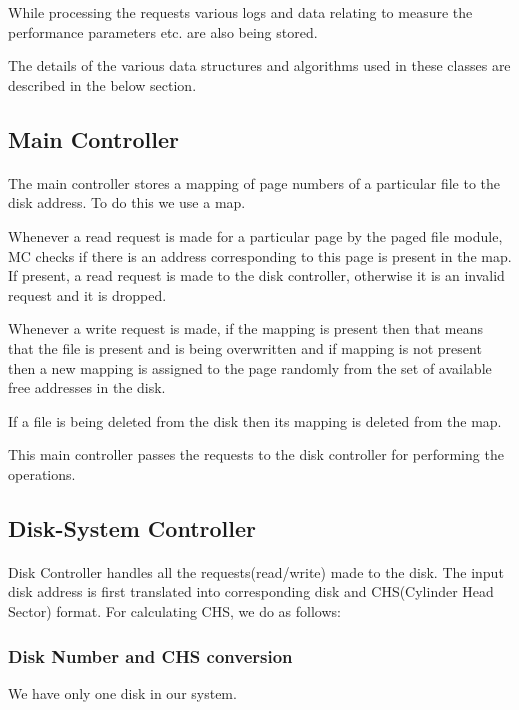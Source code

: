 \documentclass[11pt]{article}
\begin{document}
While processing the requests various logs and data relating to measure the performance parameters etc. are also being stored.

The details of the various data structures and algorithms used in these classes are described in the below section.

\subsection{Main Controller}
\paragraph{}
The main controller stores a mapping of page numbers of a particular file to the disk address. To do this we use a map.

Whenever a read request is made for a particular page by the paged file module, MC checks if there is an address corresponding to this page is present in the map. If present, a read request is made to the disk controller, otherwise it is an invalid request and it is dropped.

Whenever a write request is made, if the mapping is present then that means that the file is  present and is being overwritten and if mapping is not present then a new mapping is assigned to the page randomly from the set of available free addresses in the disk.

If a file is being deleted from the disk then its mapping is deleted from the map.

This main controller passes the requests to the disk controller for performing the operations.


\subsection{Disk-System Controller}
\paragraph{}
Disk Controller handles all the requests(read/write) made to the disk. The input disk address is first translated into corresponding disk and CHS(Cylinder Head Sector) format. For calculating CHS, we do as follows:

\subsubsection{Disk Number and CHS conversion}
We have only one disk in our system.
\end{document}
